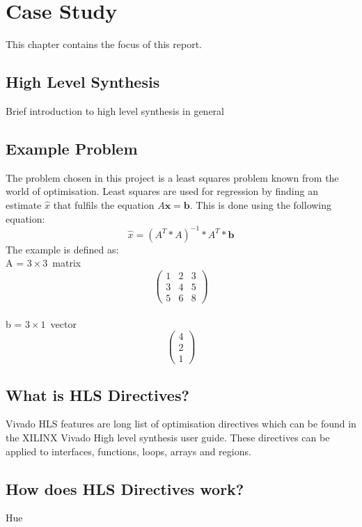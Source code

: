 \chapter{Case Study}
This chapter contains the focus of this report.

\section{High Level Synthesis}
Brief introduction to high level synthesis in general

\section{Example Problem}
The problem chosen in this project is a least squares problem known from the world of optimisation. Least squares are used for regression by finding an estimate $\hat{x}$ that fulfils the equation $A\textbf{x} = \textbf{b}$. This is done using the following equation:
\begin{equation}
\label{leastsquares}
\hat{x} = (A^T * A)^{-1}*A^T*\textbf{b}
\end{equation}
The example is defined as:\\
A = $3 \times 3$~matrix
\[ \left( \begin{array}{ccc}
1 & 2 & 3 \\
3 & 4 & 5 \\
5 & 6 & 8 \end{array} \right)\] \\
b = $3 \times 1$~vector
\[ \left( \begin{array}{c}
4 \\
2 \\
1 \end{array} \right)\]

\section{What is HLS Directives?}
Vivado HLS features are long list of optimisation directives which can be found in the XILINX Vivado High level synthesis user guide. These directives can be applied to interfaces, functions, loops, arrays and regions. 


\section{How does HLS Directives work?}
Hue
